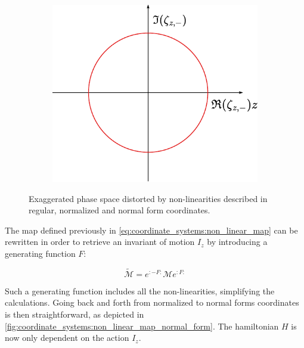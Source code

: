 \begin{figure}[H]
\begin{subfigure}[b]{0.292\textwidth}
    \end{subfigure}
    \begin{subfigure}[b]{0.316\textwidth}
        \includegraphics[width=\linewidth]{images/phase_space_normal_form_coordinates.pdf}
    \end{subfigure}
    \caption{Exaggerated phase space distorted by non-linearities described in regular, normalized and normal form coordinates.}
    \label{fig:coordinate_systems:distorted_phase_space}
\end{figure}

The map defined previously in \cref{eq:coordinate_systems:non_linear_map} can be rewritten in order
to retrieve an invariant of motion $I_z$ by introducing a generating function $F$:

\begin{equation}
    \tilde{\mathcal{M}} = e^{:-F:} \mathcal{M} e^{:F:}
    \label{eq:coordinate_systems:non_linear_map_normal_form}
\end{equation}



Such a generating function includes all the non-linearities, simplifying the calculations.
Going back and forth from normalized to normal forms coordinates is then straightforward, as
depicted in \cref{fig:coordinate_systems:non_linear_map_normal_form}. The hamiltonian $H$ is now
only dependent on the action $I_z$.


